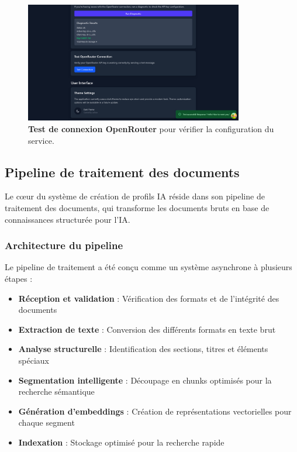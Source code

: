 \begin{figure}[H]
  \centering
  \includegraphics[width=0.85\textwidth,keepaspectratio]{pfe-pics/ai-profile-creation/test_openRouter_connection.png}
  \caption{\textbf{Test de connexion OpenRouter} pour vérifier la configuration du service.}
  \label{fig:openrouter_test}
\end{figure}

\subsection{Pipeline de traitement des documents}

Le cœur du système de création de profils IA réside dans son pipeline de traitement des documents, qui transforme les documents bruts en base de connaissances structurée pour l'IA.

\subsubsection{Architecture du pipeline}

Le pipeline de traitement a été conçu comme un système asynchrone à plusieurs étapes :

\begin{itemize}
  \item \textbf{Réception et validation} : Vérification des formats et de l'intégrité des documents
  
  \item \textbf{Extraction de texte} : Conversion des différents formats en texte brut
  
  \item \textbf{Analyse structurelle} : Identification des sections, titres et éléments spéciaux
  
  \item \textbf{Segmentation intelligente} : Découpage en chunks optimisés pour la recherche sémantique
  
  \item \textbf{Génération d'embeddings} : Création de représentations vectorielles pour chaque segment
  
  \item \textbf{Indexation} : Stockage optimisé pour la recherche rapide
\end{itemize}


